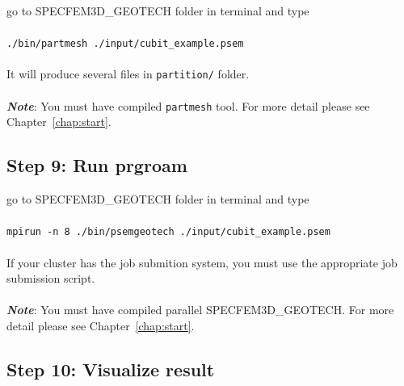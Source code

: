 go to SPECFEM3D\_GEOTECH folder in terminal and type\\
\\
\texttt{./bin/partmesh ./input/cubit\_example.psem}\\
\\
It will produce several files in \texttt{partition/} folder.\\
\\
\textbf{\emph{Note}}: You must have compiled \texttt{partmesh} tool. For more detail please see Chapter~\ref{chap:start}.

\subsection*{Step 9: Run prgroam}

go to SPECFEM3D\_GEOTECH folder in terminal and type\\
\\
\texttt{mpirun -n 8 ./bin/psemgeotech ./input/cubit\_example.psem}\\
\\
If your cluster has the job submition system, you must use the appropriate job submission script.\\
\\

\textbf{\emph{Note}}: You must have compiled parallel SPECFEM3D\_GEOTECH. For more detail please see Chapter~\ref{chap:start}.

\subsection*{Step 10: Visualize result}

